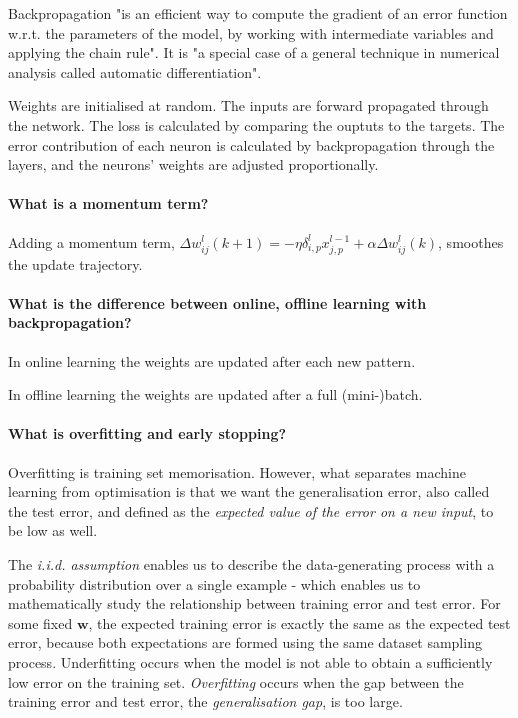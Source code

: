 Backpropagation "is an efficient way to compute the gradient
of an error function w.r.t. the parameters of the model,
by working with intermediate variables and applying the chain rule".
It is "a special case of a general technique in numerical analysis
called automatic differentiation". \citep{deisenroth2020mathematicsforml}

Weights are initialised at random.
The inputs are forward propagated through the network.
The loss is calculated by comparing the ouptuts to the targets.
The error contribution of each neuron is calculated by backpropagation through the layers,
and the neurons' weights are adjusted proportionally.

\paragraph{What is a momentum term?}

Adding a momentum term,
$\Delta w_{ij}^l(k+1) = - \eta \delta_{i,p}^l x_{j,p}^{l-1} + \alpha \Delta w_{ij}^l(k)$,
smoothes the update trajectory.

\paragraph{What is the difference between online, offline learning with backpropagation?}

In online learning the weights are updated after each new pattern.

\noindent In offline learning the weights are updated after a full (mini-)batch.

\paragraph{What is overfitting and early stopping?}

Overfitting is training set memorisation.
However, what separates machine learning from optimisation is that we want the generalisation error, also called the test error, and defined as the \textit{expected value of the error on a new input}, to be low as well.

The \textit{i.i.d. assumption} enables us to describe the data-generating process with a probability distribution over a single example - which enables us to mathematically study the relationship between training error and test error.
For some fixed $\bm{w}$, the expected training error is exactly the same as the expected test error, because both expectations are formed using the same dataset sampling process.
Underfitting occurs when the model is not able to obtain a sufficiently low error on the training set.
\textit{Overfitting} occurs when the gap between the training error and test error, the \textit{generalisation gap}, is too large.

